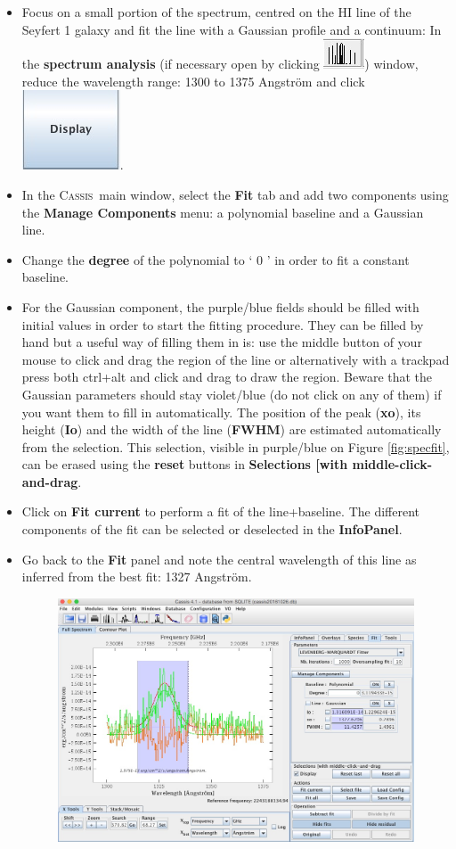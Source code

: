 \documentclass [a4paper, 12pt]{article}
\newcommand{\cassis}{{\textsc{Cassis}}}
\begin{document}
\begin{itemize}
\item Focus on a small portion of the spectrum, centred on the HI line of the 
Seyfert 1 galaxy and fit the line with a Gaussian profile and a continuum: In 
the \textbf{spectrum analysis} (if necessary open by clicking 
\includegraphics[width=0.05  
\textwidth]{../images/cassis_button_spec-analysis.jpg}) window, reduce the 
wavelength range: 
1300 to 1375 Angstr\"om and click \includegraphics[width=0.05  
\textwidth]{../images/cassis_button_display.jpg}.
\item In the \cassis\ main window, select the \textbf{Fit} tab and add two 
components using the \textbf{Manage Components} menu: a polynomial baseline and 
a Gaussian line.
\item Change the \textbf{degree} of the polynomial to ` 0 ' in order to fit a constant baseline.
\item For the Gaussian component, the purple/blue fields should be filled with initial values in order to start the fitting procedure. They can be filled by hand but a useful way of filling them in is: use the middle button of your mouse to click and drag the region of the line or alternatively with a trackpad press both ctrl+alt and click and drag to draw the region. Beware that the Gaussian parameters should stay violet/blue (do not click on any of them) if you want them to fill in automatically. The position of the peak (\textbf{xo}), its height (\textbf{Io}) and the width of the line (\textbf{FWHM}) are estimated automatically from the selection. This selection, visible in purple/blue on Figure \ref{fig:specfit}, can be erased using the \textbf{reset} buttons in \textbf{Selections [with middle-click-and-drag}.
\item Click on \textbf{Fit current} to perform a fit of the line+baseline. The different components of the fit can be selected or deselected in the \textbf{InfoPanel}.
\item Go back to the \textbf{Fit} panel and note the central wavelength of this line as inferred from the best fit: 1327 Angstr\"om. 
\begin{figure}[H]
\center
\includegraphics[width=0.6  \textwidth]{../images/cassis_window_fit-spec.jpg}

\end{figure}
\end{itemize}
\end{document}
